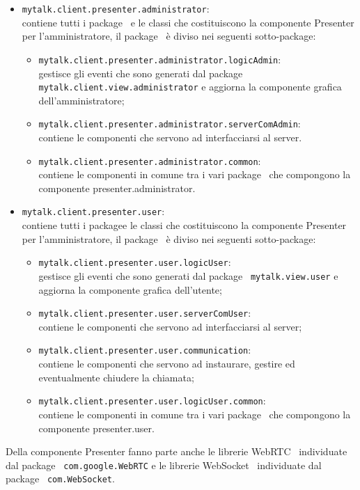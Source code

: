 \begin{itemize}
	\item \texttt{mytalk.client.presenter.administrator}: \\contiene tutti i package\g~ e le classi che costituiscono la componente Presenter per l'amministratore, il package\g~ è diviso nei seguenti sotto-package\g:
		\begin{itemize}
			\item \texttt{mytalk.client.presenter.administrator.logicAdmin}: \\gestisce gli eventi che sono generati dal package\g~ \\ \texttt{mytalk.client.view.administrator} e aggiorna la componente grafica dell'amministratore;
			\item \texttt{mytalk.client.presenter.administrator.serverComAdmin}:\\contiene le componenti che servono ad interfacciarsi al server\g .
			\item \texttt{mytalk.client.presenter.administrator.common}:\\ contiene le componenti in comune tra i vari package\g~ che compongono la componente presenter.administrator.
		\end{itemize} 
	\item \texttt{mytalk.client.presenter.user}: \\contiene tutti i package\g e le classi che costituiscono la componente Presenter per l'amministratore, il package\g~ è diviso nei seguenti sotto-package\g:
		\begin{itemize}
			\item \texttt{mytalk.client.presenter.user.logicUser}:\\ gestisce gli eventi che sono generati dal package\g~ \texttt{mytalk.view.user} e aggiorna la componente grafica dell'utente;
			\item \texttt{mytalk.client.presenter.user.serverComUser}:\\contiene le componenti che servono ad interfacciarsi al server\g ;
			\item \texttt{mytalk.client.presenter.user.communication}:\\contiene le componenti che servono ad instaurare, gestire ed eventualmente chiudere la chiamata\g ;
			\item \texttt{mytalk.client.presenter.user.logicUser.common}:\\ contiene le componenti in comune tra i vari package\g~ che compongono la componente presenter.user.
		\end{itemize} 
	\end{itemize}
	Della componente Presenter fanno parte anche le librerie WebRTC\g~ individuate dal package\g~ \texttt{com.google.WebRTC} e le librerie WebSocket\g~ individuate dal package\g~ \texttt{com.WebSocket}.
	
